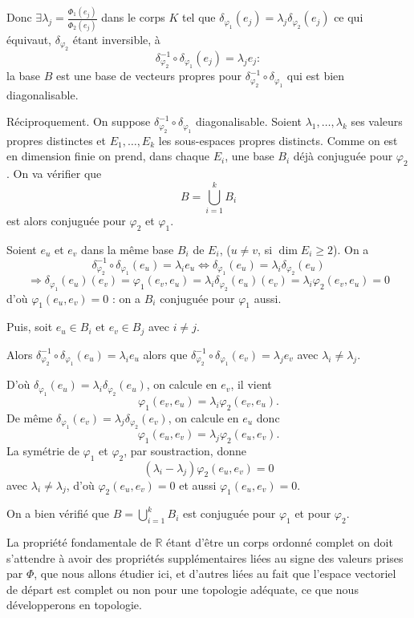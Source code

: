 Donc $\exists\lambda_j=\frac{\Phi_1(e_j)}{\Phi_2(e_j)}$ dans le corps $K$ tel que $\delta_{\varphi_1}(e_j)=\lambda_j\delta_{\varphi_2}(e_j)$ ce qui équivaut, $\delta_{\varphi_2}$ étant inversible, à
\[
\delta_{\varphi_2}^{-1}\circ\delta_{\varphi_1}(e_j)=\lambda_je_j:
\]
la base $B$ est une base de vecteurs propres pour $\delta_{\varphi_2}^{-1}\circ\delta_{\varphi_1}$ qui est bien diagonalisable.

Réciproquement. On suppose $\delta_{\varphi_2}^{-1}\circ\delta_{\varphi_1}$ diagonalisable. Soient $\lambda_1,\ldots,\lambda_k$ ses valeurs propres distinctes et $E_1,\ldots,E_k$ les sous-espaces propres distincts. Comme on est en dimension finie on prend, dans chaque $E_i$, une base $B_i$ déjà conjuguée pour $\varphi_2$. On va vérifier que
\[
B=\bigcup_{i=1}^kB_i
\]
est alors conjuguée pour $\varphi_2$ et $\varphi_1$.

Soient $e_u$ et $e_v$ dans la même base $B_i$ de $E_i$, ($u\ne v$, si $\dim E_i\ge2$). On a
\[
\delta_{\varphi_2}^{-1}\circ\delta_{\varphi_1}(e_u)=\lambda_ie_u
\Longleftrightarrow\delta_{\varphi_1}(e_u)=\lambda_i\delta_{\varphi_2}(e_u)
\]
\[
\Longrightarrow\delta_{\varphi_1}(e_u)(e_v)=\varphi_1(e_v,e_u)
=\lambda_i\delta_{\varphi_2}(e_u)(e_v)
=\lambda_i\varphi_2(e_v,e_u)=0
\]
d'où $\varphi_1(e_u,e_v)=0$ : on a $B_i$ conjuguée pour $\varphi_1$ aussi.

Puis, soit $e_u\in B_i$ et $e_v\in B_j$ avec $i\ne j$.

Alors $\delta_{\varphi_2}^{-1}\circ\delta_{\varphi_1}(e_u)=\lambda_ie_u$ alors que $\delta_{\varphi_2}^{-1}\circ\delta_{\varphi_1}(e_v)=\lambda_je_v$ avec $\lambda_i\ne\lambda_j$.

D'où $\delta_{\varphi_1}(e_u)=\lambda_i\delta_{\varphi_2}(e_u)$, on calcule en $e_v$, il vient
\[
\varphi_1(e_v,e_u)=\lambda_i\varphi_2(e_v,e_u).
\]
De même $\delta_{\varphi_1}(e_v)=\lambda_j\delta_{\varphi_2}(e_v)$, on calcule en $e_u$ donc
\[
\varphi_1(e_u,e_v)=\lambda_j\varphi_2(e_u,e_v).
\]
La symétrie de $\varphi_1$ et $\varphi_2$, par soustraction, donne
\[
(\lambda_i-\lambda_j)\varphi_2(e_u,e_v)=0
\]
avec $\lambda_i\ne\lambda_j$, d'où $\varphi_2(e_u,e_v)=0$ et aussi $\varphi_1(e_u,e_v)=0$.

On a bien vérifié que $B=\bigcup_{i=1}^kB_i$ est conjuguée pour $\varphi_1$ et pour $\varphi_2$. \bookend


La propriété fondamentale de $\mathbb R$ étant d'être un corps ordonné complet on doit s'attendre à avoir des propriétés supplémentaires liées au signe des valeurs prises par $\Phi$, que nous allons étudier ici, et d'autres liées au fait que l'espace vectoriel de départ est complet ou non pour une topologie adéquate, ce que nous développerons en topologie.
